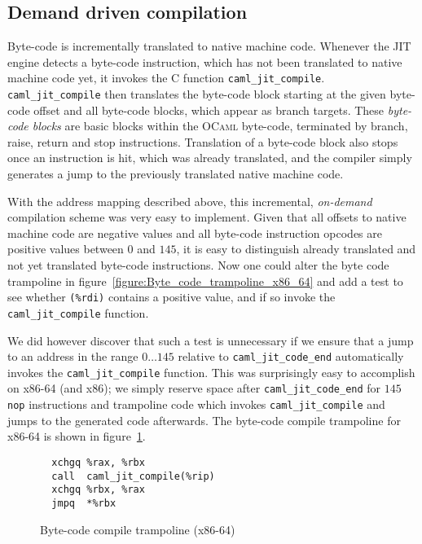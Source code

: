 \documentclass[10pt,a4paper,twocolumn]{article}
\begin{document}
\subsection{Demand driven compilation}

Byte-code is incrementally translated to native machine code. Whenever the JIT engine detects a
byte-code instruction, which has not been translated to native machine code yet, it invokes the
C function \texttt{caml\_jit\_compile}. \texttt{caml\_jit\_compile} then translates the byte-code
block starting at the given byte-code offset and all byte-code blocks, which appear as branch
targets. These \emph{byte-code blocks} are basic blocks within the \textsc{OCaml} byte-code,
terminated by branch, raise, return and stop instructions. Translation of a byte-code block also
stops once an instruction is hit, which was already translated, and the compiler simply generates
a jump to the previously translated native machine code.

With the address mapping described above, this incremental, \emph{on-demand} compilation scheme
was very easy to implement. Given that all offsets to native machine code are negative values and
all byte-code instruction opcodes are positive values between $0$ and $145$, it is easy to distinguish
already translated and not yet translated byte-code instructions. Now one could alter the byte code
trampoline in figure~\ref{figure:Byte_code_trampoline_x86_64} and add a test to see whether \texttt{(\%rdi)}
contains a positive value, and if so invoke the \texttt{caml\_jit\_compile} function.

We did however discover that such a test is unnecessary if we ensure that a jump to an address in
the range $0 \ldots 145$ relative to \texttt{caml\_jit\_code\_end} automatically invokes the
\texttt{caml\_jit\_compile} function. This was surprisingly easy to accomplish on x86-64 (and
x86); we simply reserve space after \texttt{caml\_jit\_code\_end} for $145$ \texttt{nop} instructions
and trampoline code which invokes \texttt{caml\_jit\_compile} and jumps to the generated code afterwards.
The byte-code compile trampoline for x86-64 is shown in figure~\ref{figure:Byte_code_compile_trampoline_x86_64}.

\begin{figure}[ht]
  \centering
  \begin{verbatim}
  xchgq %rax, %rbx
  call  caml_jit_compile(%rip)
  xchgq %rbx, %rax
  jmpq  *%rbx
\end{verbatim}
  \caption{Byte-code compile trampoline (x86-64)}
  \label{figure:Byte_code_compile_trampoline_x86_64}
\end{figure}
\end{document}
